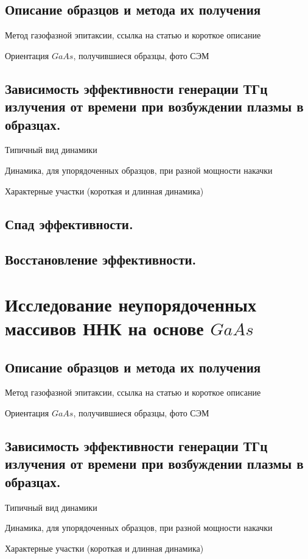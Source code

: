 \documentclass[a4paper,14pt,russian]{extreport}
\begin{document}
			\subsection{Описание образцов и метода их получения}
				Метод газофазной эпитаксии, ссылка на
				статью и короткое описание\par
				Ориентация $GaAs$, получившиеся образцы,
				фото СЭМ
			\newpage
			\subsection{Зависимость эффективности генерации ТГц излучения от времени при возбуждении плазмы в образцах.}
				Типичный вид динамики\par
				Динамика, для упорядоченных образцов,
				при разной мощности накачки\par
				Характерные участки (короткая и длинная
				динамика)\par
			\subsection{Спад эффективности.}
			\subsection{Восстановление эффективности.}
		\section{Исследование неупорядоченных массивов ННК на основе $GaAs$}
			\subsection{Описание образцов и метода их получения}
				Метод газофазной эпитаксии, ссылка на
				статью и короткое описание\par
				Ориентация $GaAs$, получившиеся образцы,
				фото СЭМ
			\newpage
			\subsection{Зависимость эффективности генерации ТГц излучения от времени при возбуждении плазмы в образцах.}
				Типичный вид динамики\par
				Динамика, для упорядоченных образцов,
				при разной мощности накачки\par
				Характерные участки (короткая и длинная
				динамика)\par
\end{document}
